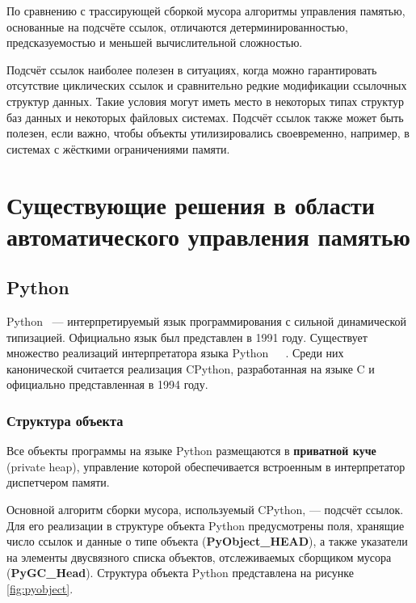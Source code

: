 По сравнению с трассирующей сборкой мусора алгоритмы управления памятью, основанные на подсчёте ссылок, отличаются детерминированностью, предсказуемостью и меньшей вычислительной сложностью.~\cite{cornell2} %

Подсчёт ссылок наиболее полезен в ситуациях, когда можно гарантировать отсутствие циклических ссылок и сравнительно редкие модификации ссылочных структур данных. Такие условия могут иметь место в некоторых типах структур баз данных и некоторых файловых системах. Подсчёт ссылок также может быть полезен, если важно, чтобы объекты утилизировались своевременно, например, в системах с жёсткими ограничениями памяти.~\cite{recycling}




\section{Существующие решения в области автоматического управления памятью}

\subsection{Python}

Python~\cite{python} --- интерпретируемый язык программирования с сильной динамической типизацией. Официально язык был представлен в 1991 году. Существует множество реализаций интерпретатора языка Python~\cite{juthon}~\cite{ironpython}~\cite{pypy}. Среди них канонической считается реализация CPython, разработанная на языке C и официально представленная в 1994 году.~\cite{cpython}

\subsubsection{Структура объекта}

Все объекты программы на языке Python размещаются в \textbf{приватной куче} (private heap), управление которой обеспечивается встроенным в интерпретатор диспетчером памяти.~\cite{python_memory}

Основной алгоритм сборки мусора, используемый CPython, --- подсчёт ссылок. Для его реализации в структуре объекта Python предусмотрены поля, хранящие число ссылок и данные о типе объекта (\textbf{PyObject\_HEAD}), а также указатели на элементы двусвязного списка объектов, отслеживаемых сборщиком мусора (\textbf{PyGC\_Head}). Структура объекта Python представлена на рисунке \ref{fig:pyobject}.~\cite{python_gc}

